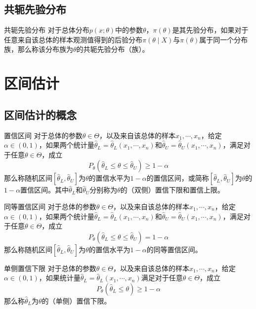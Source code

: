 \documentclass[lang = cn, scheme = chinese, thmcnt = section]{elegantbook}
\begin{document}
\subsection{共轭先验分布}

\begin{definition}{共轭先验分布}
	对于总体分布$p(x;\theta)$中的参数$\theta$，$\pi(\theta)$是其先验分布，如果对于任意来自该总体的样本观测值得到的后验分布$\pi(\theta\mid X)$与$\pi(\theta)$属于同一个分布族，那么称该分布族为$\theta$的共轭先验分布（族）。
\end{definition}

\section{区间估计}

\subsection{区间估计的概念}

\begin{definition}{置信区间}
	对于总体的参数$\theta\in\Theta$，以及来自该总体的样本$x_1,\cdots,x_n$，给定$\alpha\in(0,1)$，如果两个统计量$\hat{\theta}_{L}=\hat{\theta}_{L}(x_1,\cdots,x_n)$和$\hat{\theta}_{U}=\hat{\theta}_{U}(x_1,\cdots,x_n)$，满足对于任意$\theta\in\Theta$，成立
	$$
	P_{\theta}(\hat{\theta}_{L}\le\theta\le\hat{\theta}_{U})\ge 1-\alpha
	$$
	那么称随机区间$[\hat{\theta}_{L},\hat{\theta}_{U}]$为$\theta$的置信水平为$1-\alpha$的置信区间，或简称$[\hat{\theta}_{L},\hat{\theta}_{U}]$为$\theta$的$1-\alpha$置信区间。其中$\hat{\theta}_{L}$和$\hat{\theta}_{U}$分别称为$\theta$的（双侧）置信下限和置信上限。
\end{definition}

\begin{definition}{同等置信区间}
	对于总体的参数$\theta\in\Theta$，以及来自该总体的样本$x_1,\cdots,x_n$，给定$\alpha\in(0,1)$，如果两个统计量$\hat{\theta}_{L}=\hat{\theta}_{L}(x_1,\cdots,x_n)$和$\hat{\theta}_{U}=\hat{\theta}_{U}(x_1,\cdots,x_n)$，满足对于任意$\theta\in\Theta$，成立
	$$
	P_{\theta}(\hat{\theta}_{L}\le\theta\le\hat{\theta}_{U})=1-\alpha
	$$
	那么称随机区间$[\hat{\theta}_{L},\hat{\theta}_{U}]$为$\theta$的置信水平为$1-\alpha$的同等置信区间。
\end{definition}

\begin{definition}{单侧置信下限}
	对于总体的参数$\theta\in\Theta$，以及来自该总体的样本$x_1,\cdots,x_n$，给定$\alpha\in(0,1)$，如果统计量$\hat{\theta}_{L}=\hat{\theta}_{L}(x_1,\cdots,x_n)$满足对于任意$\theta\in\Theta$，成立
	$$
	P_{\theta}(\hat{\theta}_{L}\le\theta)\ge 1-\alpha
	$$
	那么称$\hat{\theta}_{L}$为$\theta$的（单侧）置信下限。
\end{definition}
\end{document}
